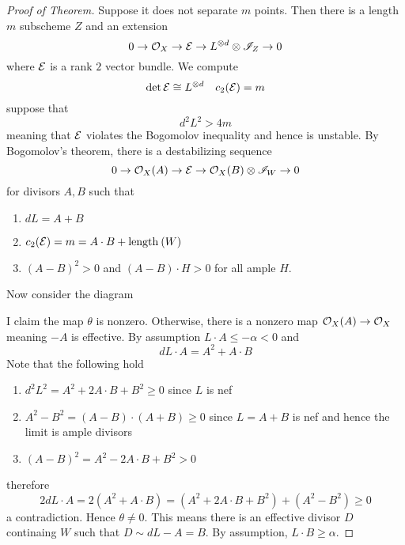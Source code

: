 \documentclass[12pt]{article}
\begin{document}
\begin{proof}[Proof of Theorem]
Suppose it does not separate $m$ points. Then there is a length $m$ subscheme $Z$ and an extension
\[ 0 \to \mathcal{O}_{X} \to \mathcal{E} \to L^{\otimes d} \otimes \mathscr{I}_Z \to 0 \]
where $\mathcal{E}$ is a rank $2$ vector bundle. We compute
\[ \det{\mathcal{E}} \cong L^{\otimes d} \quad c_2(\mathcal{E}) = m \]
suppose that
\[ d^2 L^2 > 4 m \]
meaning that $\mathcal{E}$ violates the Bogomolov inequality and hence is unstable. By Bogomolov's theorem, there is a destabilizing sequence
\[ 0 \to \mathcal{O}_{X}(A) \to \mathcal{E} \to \mathcal{O}_{X}(B) \otimes \mathscr{I}_W \to 0 \] 
for divisors $A,B$ such that
\begin{enumerate}
\item $d L = A + B$
\item $c_2(\mathcal{E}) = m = A \cdot B + \mathrm{length}_{}\left( W \right)$
\item $(A - B)^2 > 0$ and $(A - B) \cdot H > 0$ for all ample $H$.
\end{enumerate}
Now consider the diagram
\begin{center}
\end{center}
I claim the map $\theta$ is nonzero. Otherwise, there is a nonzero map $\mathcal{O}_{X}(A) \to \mathcal{O}_{X}$ meaning $-A$ is effective. By assumption $L \cdot A \le -\alpha < 0$ and
\[ d L \cdot A = A^2 + A \cdot B \]
Note that the following hold
\begin{enumerate}
\item $d^2 L^2 = A^2 + 2 A \cdot B + B^2 \ge 0$ since $L$ is nef
\item $A^2 - B^2 = (A - B) \cdot (A + B) \ge 0$ since $L = A + B$ is nef and hence the limit is ample divisors
\item $(A - B)^2 = A^2 - 2 A \cdot B + B^2 > 0$
\end{enumerate}
therefore 
\[ 2 d L \cdot A = 2(A^2 + A \cdot B) = (A^2 + 2 A \cdot B + B^2) + (A^2 - B^2) \ge 0 \]
a contradiction. Hence $\theta \neq 0$. This means there is an effective divisor $D$ continaing $W$ such that $D \sim d L - A = B$. By assumption, $L \cdot B \ge \alpha$.  


\end{proof}
\end{document}
